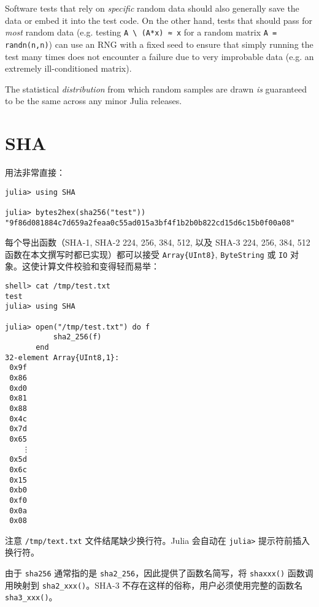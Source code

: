 Software tests that rely on \emph{specific} {\textquotedbl}random{\textquotedbl} data should also generally save the data or embed it into the test code.  On the other hand, tests that should pass for \emph{most} random data (e.g. testing \texttt{A {\textbackslash} (A*x) ≈ x} for a random matrix \texttt{A = randn(n,n)}) can use an RNG with a fixed seed to ensure that simply running the test many times does not encounter a failure due to very improbable data (e.g. an extremely ill-conditioned matrix).



The statistical \emph{distribution} from which random samples are drawn \emph{is} guaranteed to be the same across any minor Julia releases.



\hypertarget{15457917914318839048}{}


\chapter{SHA}



用法非常直接：




\begin{verbatim}
julia> using SHA

julia> bytes2hex(sha256("test"))
"9f86d081884c7d659a2feaa0c55ad015a3bf4f1b2b0b822cd15d6c15b0f00a08"
\end{verbatim}



每个导出函数（SHA-1, SHA-2 224, 256, 384, 512, 以及 SHA-3 224, 256, 384, 512 函数在本文撰写时都已实现）都可以接受 \texttt{Array\{UInt8\}}, \texttt{ByteString} 或 \texttt{IO} 对象。这使计算文件校验和变得轻而易举：




\begin{verbatim}
shell> cat /tmp/test.txt
test
julia> using SHA

julia> open("/tmp/test.txt") do f
           sha2_256(f)
       end
32-element Array{UInt8,1}:
 0x9f
 0x86
 0xd0
 0x81
 0x88
 0x4c
 0x7d
 0x65
    ⋮
 0x5d
 0x6c
 0x15
 0xb0
 0xf0
 0x0a
 0x08
\end{verbatim}



注意 \texttt{/tmp/text.txt} 文件结尾缺少换行符。Julia 会自动在 \texttt{julia>} 提示符前插入换行符。



由于 \texttt{sha256} 通常指的是 \texttt{sha2\_256}，因此提供了函数名简写，将 \texttt{shaxxx()} 函数调用映射到 \texttt{sha2\_xxx()}。SHA-3 不存在这样的俗称，用户必须使用完整的函数名 \texttt{sha3\_xxx()}。



